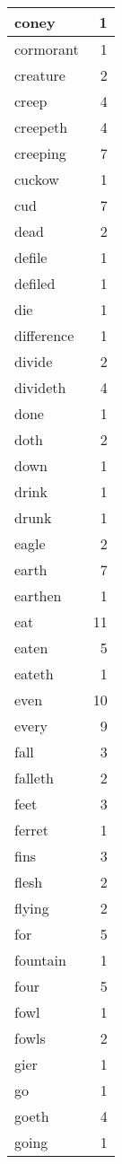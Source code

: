 \begin{center}
\begin{longtable}{l|r}
coney & 1 \\ \hline
cormorant & 1 \\ \hline
creature & 2 \\ \hline
creep & 4 \\ \hline
creepeth & 4 \\ \hline
creeping & 7 \\ \hline
cuckow & 1 \\ \hline
cud & 7 \\ \hline
dead & 2 \\ \hline
defile & 1 \\ \hline
defiled & 1 \\ \hline
die & 1 \\ \hline
difference & 1 \\ \hline
divide & 2 \\ \hline
divideth & 4 \\ \hline
done & 1 \\ \hline
doth & 2 \\ \hline
down & 1 \\ \hline
drink & 1 \\ \hline
drunk & 1 \\ \hline
eagle & 2 \\ \hline
earth & 7 \\ \hline
earthen & 1 \\ \hline
eat & 11 \\ \hline
eaten & 5 \\ \hline
eateth & 1 \\ \hline
even & 10 \\ \hline
every & 9 \\ \hline
fall & 3 \\ \hline
falleth & 2 \\ \hline
feet & 3 \\ \hline
ferret & 1 \\ \hline
fins & 3 \\ \hline
flesh & 2 \\ \hline
flying & 2 \\ \hline
for & 5 \\ \hline
fountain & 1 \\ \hline
four & 5 \\ \hline
fowl & 1 \\ \hline
fowls & 2 \\ \hline
gier & 1 \\ \hline
go & 1 \\ \hline
goeth & 4 \\ \hline
going & 1 \\ \hline

\end{longtable}
\end{center}
